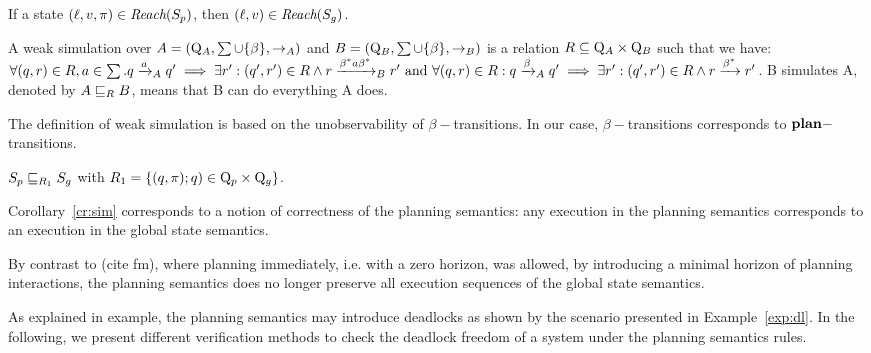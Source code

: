 \begin{corollary}\label{cr:reach}
  If a state $(\ell,v,\pi)\in\textit{Reach}(S_p)$, then $(\ell,v)\in\textit{Reach}(S_g)$.
\end{corollary}

\begin{definition}
  A weak simulation over $A=(\mathrm{Q}_A,\sum\cup\{\beta\},\to_A)$ and $B=(\mathrm{Q}_B,\sum\cup\{\beta\},
  \to_B)$ is a relation $R\subseteq \mathrm{Q}_A\times \mathrm{Q}_B$ such that we have: 
  $\forall(q,r)\in R, a\in \sum .q\xrightarrow{a}_A q' \implies\exists r':(q',r')\in R\wedge r\xrightarrow{
  \beta^*a\beta^*}_B r' \text{ and } \forall(q,r)\in R: q\xrightarrow{\beta}_Aq'\implies\exists r':
  (q',r')\in R\wedge r\xrightarrow{\beta^*}r'$.
  B simulates A, denoted by $A\sqsubseteq_{R}B$, means that B can do everything A does.
\end{definition}
The definition of weak simulation is based on the unobservability of $\beta-$transitions. In our case, $\beta-$transitions corresponds to $\textnormal{\textbf{plan}}-$transitions.
\begin{corollary}\label{cr:sim}
  $S_p\sqsubseteq_{R_1} S_g$ with $R_1=\{(q,\pi);q)\in\mathrm{Q}_p\times\mathrm{Q}_g\}$.
\end{corollary}

Corollary~\ref{cr:sim} corresponds to a notion of correctness of the planning semantics: any execution in the planning semantics corresponds to an execution in the global state semantics.

By contrast to (cite fm), where planning immediately, i.e. with a zero horizon, was allowed, 
by introducing a minimal horizon of planning interactions, the planning semantics does no longer
preserve all execution sequences of the global state semantics.

As explained in example, the planning semantics may introduce deadlocks as shown by the scenario presented in Example~\ref{exp:dl}.
In the following, we present different verification methods to check the deadlock freedom of a system under the planning semantics rules.





